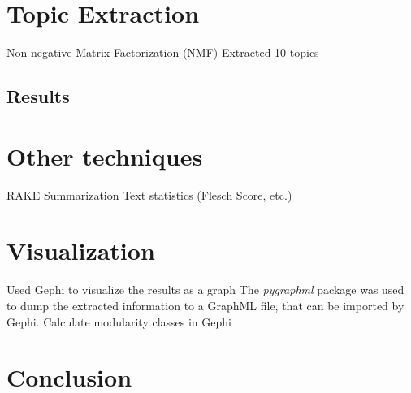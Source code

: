 \documentclass[10pt,a4paper]{article}
\begin{document}
	\section{Topic Extraction}
	Non-negative Matrix Factorization (NMF)
	Extracted 10 topics
	
		\subsection{Results}
	
	\section{Other techniques}
	RAKE
	Summarization
	Text statistics (Flesch Score, etc.)
	
	\section{Visualization}
	Used Gephi to visualize the results as a graph
	The \textit{pygraphml} package was used to dump the extracted information to a GraphML file, that can be imported by Gephi.
	Calculate modularity classes in Gephi

	\section{Conclusion}
	
	\newpage
	
	
	
	
\end{document}
